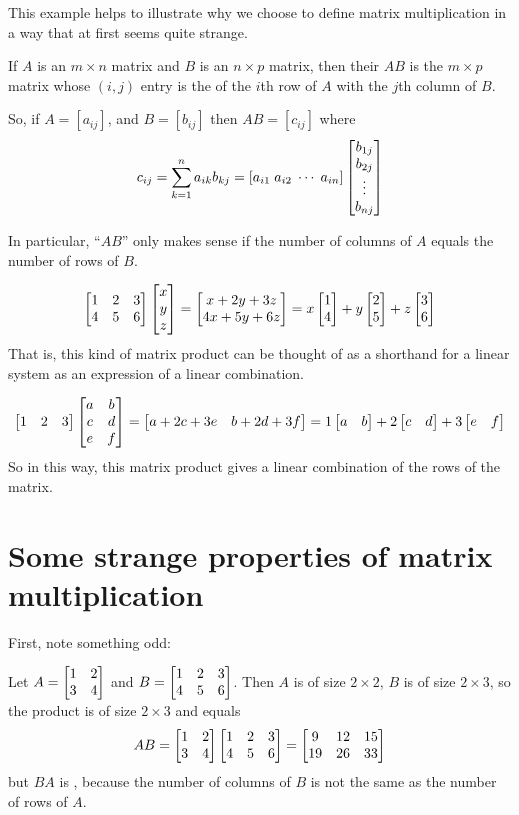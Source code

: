 This example helps to illustrate why we choose to define matrix
multiplication in a way that at first seems quite strange.

\begin{definition}
If $A$ is an $m \times n$ matrix and $B$ is an $n \times p$ matrix,
then their  $AB$ is the $m\times p$ matrix whose $(i,j)$
entry is the  of the $i$th row of $A$ with
the $j$th column of $B$.

So, if $A = [a_{ij}]$, and $B = [b_{ij}]$ then $AB = [c_{ij}]$
where 
$$
c_{ij} = \sum_{k=1}^n a_{ik}b_{kj} = [a_{i1} \; a_{i2} \; \cdots \; a_{in}]\left[ \begin{matrix} b_{1j}\\b_{2j}\\ \vdots \\ b_{nj} \end{matrix} \right]
$$

In particular, ``$AB$'' only makes sense if the number of columns of $A$ 
equals the number of rows of $B$.
\end{definition}

\begin{myexample}
$$
\left[ \begin{matrix} 1 & 2 & 3\\ 4 & 5 & 6 \end{matrix} \right] \left[ \begin{matrix} x\\y\\z \end{matrix} \right] = \left[ \begin{matrix} x+2y+3z\\ 4x+5y+6z \end{matrix} \right]
= x\left[ \begin{matrix} 1\\4 \end{matrix} \right] + y\left[ \begin{matrix} 2\\5 \end{matrix} \right] + z\left[ \begin{matrix} 3\\6 \end{matrix} \right]
$$
That is, this kind of matrix product can be thought of as a shorthand for a
linear system  as an expression of a linear combination.
\end{myexample}

\begin{myexample}
$$
\left[ \begin{matrix} 1 & 2 & 3 \end{matrix} \right]\left[ \begin{matrix} a & b \\ c & d \\ e & f \end{matrix} \right] = \left[ \begin{matrix} a+2c+3e & b+2d+3f \end{matrix} \right] = 
1\left[ \begin{matrix} a & b \end{matrix} \right] + 2\left[ \begin{matrix} c&d \end{matrix} \right] + 3\left[ \begin{matrix} e&f \end{matrix} \right]
$$
So in this way, this matrix product gives a linear combination of the
rows of the matrix.
\end{myexample}


\section{Some strange properties of matrix multiplication}

First, note something odd:

\begin{myexample} Let $A = \left[ \begin{matrix} 1 & 2 \\ 3& 4 \end{matrix} \right]$ and $B = \left[ \begin{matrix} 1 & 2 & 3\\ 4&5&6 \end{matrix} \right]$.
Then $A$ is of size $2\times 2$, $B$ is of size $2\times 3$, so the
product is of size $2\times 3$ and equals
$$
AB = \left[ \begin{matrix} 1 & 2 \\ 3& 4 \end{matrix} \right]\left[ \begin{matrix} 1 & 2 & 3\\ 4&5&6 \end{matrix} \right] = \left[ \begin{matrix} 9 & 12 & 15\\ 19 & 26 & 33 \end{matrix} \right]
$$
but $BA$ is , because the number of columns of $B$
is not the same as the number of rows of $A$.
\end{myexample}

